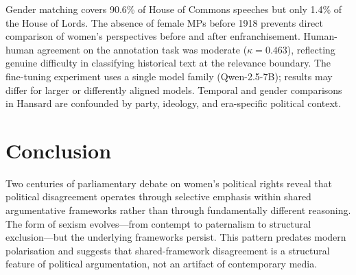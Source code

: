 \documentclass[11pt]{article}
\begin{document}
Gender matching covers 90.6\% of House of Commons speeches but only 1.4\% of the House of Lords.
The absence of female MPs before 1918 prevents direct comparison of women's perspectives before and after enfranchisement.
Human-human agreement on the annotation task was moderate ($\kappa = 0.463$), reflecting genuine difficulty in classifying historical text at the relevance boundary.
The fine-tuning experiment uses a single model family (Qwen-2.5-7B); results may differ for larger or differently aligned models.
Temporal and gender comparisons in Hansard are confounded by party, ideology, and era-specific political context.

\section{Conclusion}

Two centuries of parliamentary debate on women's political rights reveal that political disagreement operates through selective emphasis within shared argumentative frameworks rather than through fundamentally different reasoning.
The form of sexism evolves---from contempt to paternalism to structural exclusion---but the underlying frameworks persist.
This pattern predates modern polarisation and suggests that shared-framework disagreement is a structural feature of political argumentation, not an artifact of contemporary media.

% 
% 
\end{document}
